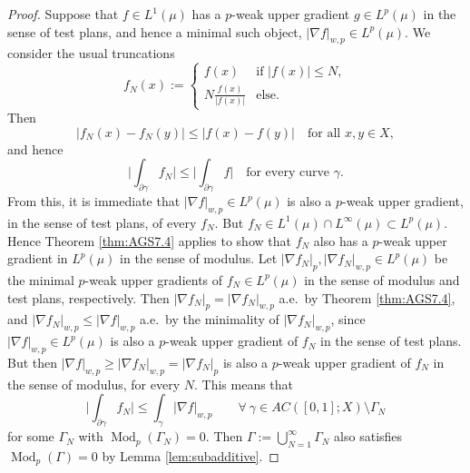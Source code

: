 \documentclass[11pt]{amsart}
\theoremstyle{definition}
\theoremstyle{remark}
\numberwithin{equation}{section}
\newcommand{\abs}[1]{|#1|}
\newcommand{\Babs}[1]{\Big|#1\Big|}
\begin{document}
\begin{proof}
Suppose that $f\in L^1(\mu)$ has a $p$-weak upper gradient $g\in L^p(\mu)$ in the sense of
test plans, and hence a minimal such object, $\abs{\nabla f}_{w,p}\in L^p(\mu)$. We consider
the usual truncations
\begin{equation}\label{eq:fN-def}
  f_N(x):=\begin{cases} f(x) & \text{if }\abs{f(x)}\leq N, \\
  \displaystyle N\frac{f(x)}{\abs{f(x)}} & \text{else}.\end{cases}
\end{equation}
Then
\begin{equation}\label{eq:fN-key}
  \abs{f_N(x)-f_N(y)} \leq \abs{f(x)-f(y)}\quad\text{for all }x,y\in X,
\end{equation}
and hence
\begin{equation*}
  \Babs{\int_{\partial\gamma}f_N}\leq\Babs{\int_{\partial\gamma}f}\quad
  \text{for every curve }\gamma.
\end{equation*}
From this, it is immediate that $\abs{\nabla f}_{w,p}\in L^p(\mu)$ is also a $p$-weak upper
gradient, in the sense of test plans, of every $f_N$. But $f_N\in L^1(\mu)\cap
L^\infty(\mu)\subset L^p(\mu)$. Hence Theorem \ref{thm:AGS7.4} applies to show that $f_N$
also has a $p$-weak upper gradient in $L^p(\mu)$ in the sense of modulus. Let $\abs{\nabla
f_N}_{p},\abs{\nabla f_N}_{w,p}\in L^p(\mu)$ be the minimal $p$-weak upper gradients of
$f_N\in L^p(\mu)$ in the sense of modulus and test plans,
respectively. Then $\abs{\nabla f_N}_{p}=\abs{\nabla f_N}_{w,p}$ a.e.\ by Theorem
\ref{thm:AGS7.4}, and $\abs{\nabla f_N}_{w,p}\leq\abs{\nabla f}_{w,p}$ a.e.\ by the
minimality of $\abs{\nabla f_N}_{w,p}$, since $\abs{\nabla f}_{w,p}\in L^p(\mu)$ is also a
$p$-weak upper gradient of $f_N$ in the sense of test plans. But then $\abs{\nabla
f}_{w,p}\geq\abs{\nabla f_N}_{w,p}=\abs{\nabla f_N}_p$ is also a $p$-weak upper gradient of
$f_N$ in the sense of modulus, for every $N$. This means that
\begin{equation*}
  \Babs{\int_{\partial\gamma}f_N}\leq\int_\gamma\abs{\nabla f}_{w,p}\qquad
  \forall\ \gamma\in AC([0,1];X)\setminus\Gamma_N
\end{equation*}
for some $\Gamma_N$ with $\operatorname{Mod}_p(\Gamma_N)=0$. Then
$\Gamma:=\bigcup_{N=1}^\infty\Gamma_N$ also satisfies $\operatorname{Mod}_p(\Gamma)=0$ by
Lemma \ref{lem:subadditive}.


\end{proof}
\end{document}
